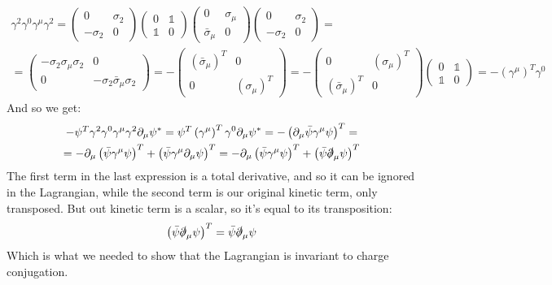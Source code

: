 \documentclass{article}
\begin{document}
\begin{equation}
\begin{gathered}
    \gamma^2\gamma^0\gamma^\mu\gamma^2 = 
    \begin{pmatrix} 0 & \sigma_2 \\ -\sigma_2 & 0 \end{pmatrix}
    \begin{pmatrix} 0 & \mathbb{1} \\ \mathbb{1} & 0 \end{pmatrix}
    \begin{pmatrix} 0 & \sigma_\mu \\ \bar{\sigma}_\mu & 0 \end{pmatrix}
    \begin{pmatrix} 0 & \sigma_2 \\ -\sigma_2 & 0 \end{pmatrix} 
    = \\ =
    \begin{pmatrix} -\sigma_2\sigma_\mu\sigma_2 & 0 \\ 0 & -\sigma_2\bar{\sigma}_\mu\sigma_2 \end{pmatrix} =
    -\begin{pmatrix} \left(\bar{\sigma}_\mu\right)^T & 0 \\ 0 & \left(\sigma_\mu\right)^T \end{pmatrix} = 
    -\begin{pmatrix} 0 & \left(\sigma_\mu\right)^T \\ \left(\bar{\sigma}_\mu\right)^T & 0 \end{pmatrix}
    \begin{pmatrix} 0 & \mathbb{1} \\ \mathbb{1} & 0 \end{pmatrix}
    = -\left(\gamma^\mu\right)^T\gamma^0
\end{gathered}
\end{equation}
And so we get:
\begin{equation}
\begin{gathered}
    -\psi^T \gamma^2\gamma^0\gamma^\mu\gamma^2 \partial_\mu\psi^* =
    \psi^T \left(\gamma^\mu\right)^T\gamma^0 \partial_\mu\psi^* = 
    -\left(
        \partial_\mu\bar{\psi}\gamma^\mu\psi
    \right)^T
    = \\ =
    -\partial_\mu\left(\bar{\psi} \gamma^\mu \psi\right)^T +
    \left(
        \bar{\psi} \gamma^\mu \partial_\mu \psi
    \right)^T =
    -\partial_\mu\left(\bar{\psi} \gamma^\mu \psi\right)^T +
    \left(
        \bar{\psi} \slashed{\partial}_\mu \psi
    \right)^T
\end{gathered}
\end{equation}
The first term in the last expression is a total derivative, and so it can be ignored in the Lagrangian, while the second term is our original kinetic term, only transposed. But out kinetic term is a scalar, so it's equal to its transposition:
\begin{equation}
    \left(
        \bar{\psi} \slashed{\partial}_\mu \psi
    \right)^T = \bar{\psi} \slashed{\partial}_\mu \psi
\end{equation}
Which is what we needed to show that the Lagrangian is invariant to charge conjugation.
\end{document}

